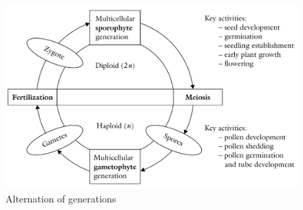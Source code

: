 \documentclass[11pt,ignorenonframetext,aspectratio=169]{beamer}
\begin{document}
\begin{frame}{}
\protect\hypertarget{section-17}{}
\begin{figure}

{\centering \includegraphics[width=0.6\linewidth]{./images/alternation_of_generations} 

}

\caption{Alternation of generations}\label{fig:alternation-generation}
\end{figure}
\end{frame}
\end{document}
